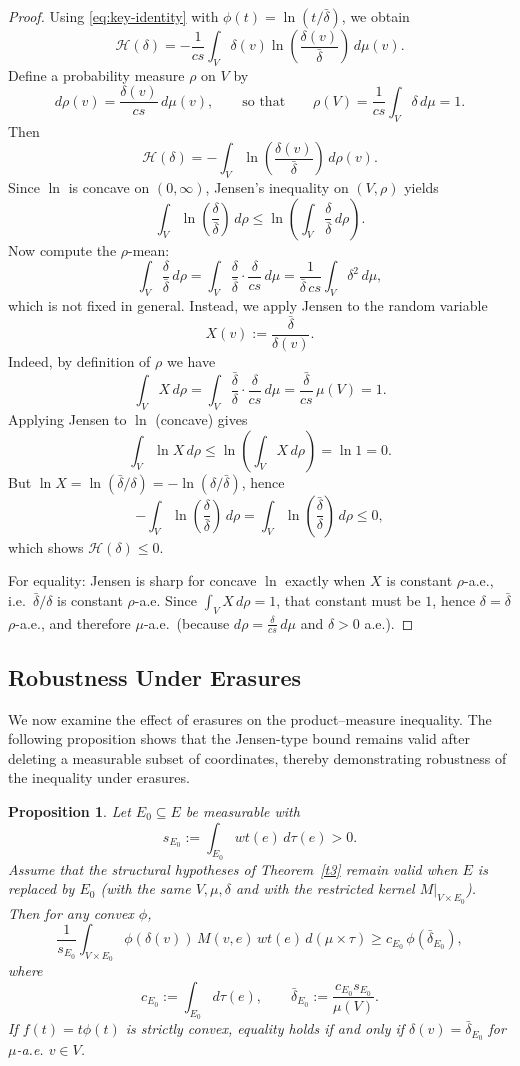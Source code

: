 \documentclass[final,1p,times]{elsarticle}
\newtheorem{prop}[thm]{Proposition}
\begin{document}
\begin{proof}
Using \eqref{eq:key-identity} with $\phi(t)=\ln(t/\bar\delta)$, we obtain
\[
\mathcal{H}(\delta)
=
-\frac{1}{cs}\int_V \delta(v)\ln\!\left(\frac{\delta(v)}{\bar\delta}\right)\,d\mu(v).
\]
Define a probability measure $\rho$ on $V$ by
\[
d\rho(v)=\frac{\delta(v)}{cs}\,d\mu(v),
\qquad\text{so that}\qquad
\rho(V)=\frac{1}{cs}\int_V \delta\,d\mu=1.
\]
Then
\[
\mathcal{H}(\delta)
=
-\int_V \ln\!\left(\frac{\delta(v)}{\bar\delta}\right)\,d\rho(v).
\]
Since $\ln$ is concave on $(0,\infty)$, Jensen's inequality on $(V,\rho)$ yields
\[
\int_V \ln\!\left(\frac{\delta}{\bar\delta}\right)\,d\rho
\le
\ln\!\left(\int_V \frac{\delta}{\bar\delta}\,d\rho\right).
\]
Now compute the $\rho$-mean:
\[
\int_V \frac{\delta}{\bar\delta}\,d\rho
=
\int_V \frac{\delta}{\bar\delta}\cdot\frac{\delta}{cs}\,d\mu
=
\frac{1}{\bar\delta\,cs}\int_V \delta^2\,d\mu,
\]
which is not fixed in general.  Instead, we apply Jensen to the random variable
\[
X(v):=\frac{\bar\delta}{\delta(v)}.
\]
Indeed, by definition of $\rho$ we have
\[
\int_V X\,d\rho
=
\int_V \frac{\bar\delta}{\delta}\cdot\frac{\delta}{cs}\,d\mu
=
\frac{\bar\delta}{cs}\,\mu(V)
=
1.
\]
Applying Jensen to $\ln$ (concave) gives
\[
\int_V \ln X\,d\rho
\le \ln\!\left(\int_V X\,d\rho\right)=\ln 1=0.
\]
But $\ln X=\ln(\bar\delta/\delta)=-\ln(\delta/\bar\delta)$, hence
\[
-\int_V \ln\!\left(\frac{\delta}{\bar\delta}\right)\,d\rho
=
\int_V \ln\!\left(\frac{\bar\delta}{\delta}\right)\,d\rho
\le 0,
\]
which shows $\mathcal{H}(\delta)\le 0$.

For equality: Jensen is sharp for concave $\ln$ exactly when $X$ is constant
$\rho$-a.e., i.e.\ $\bar\delta/\delta$ is constant $\rho$-a.e. Since
$\int_V X\,d\rho=1$, that constant must be $1$, hence $\delta=\bar\delta$
$\rho$-a.e., and therefore $\mu$-a.e.\ (because $d\rho=\frac{\delta}{cs}\,d\mu$
and $\delta>0$ a.e.).
\end{proof}

\subsection{Robustness Under Erasures}
We now examine the effect of erasures on the product–measure inequality.
The following proposition shows that the Jensen-type bound remains valid
after deleting a measurable subset of coordinates, thereby demonstrating
robustness of the inequality under erasures.

\begin{prop}
\label{prop:erasure-proof}
Let \(E_0\subseteq E\) be measurable with
\[
s_{E_0}:=\int_{E_0} wt(e)\,d\tau(e)>0.
\]
Assume that the structural hypotheses of Theorem~\ref{t3} remain valid when \(E\) is replaced by \(E_0\)
(with the same \(V,\mu,\delta\) and with the restricted kernel \(M|_{V\times E_0}\)).
Then for any convex \(\phi\),
\[
\frac{1}{s_{E_0}}
\int_{V\times E_0}\phi(\delta(v))\,M(v,e)\,wt(e)\,d(\mu\times\tau)
\ge
c_{E_0}\,\phi(\bar\delta_{E_0}),
\]
where
\[
c_{E_0}:=\int_{E_0} d\tau(e), 
\qquad
\bar\delta_{E_0}:=\frac{c_{E_0}s_{E_0}}{\mu(V)}.
\]
If \(f(t)=t\phi(t)\) is strictly convex, equality holds if and only if \(\delta(v)=\bar\delta_{E_0}\) for \(\mu\)-a.e. \(v\in V\).
\end{prop}
\end{document}
